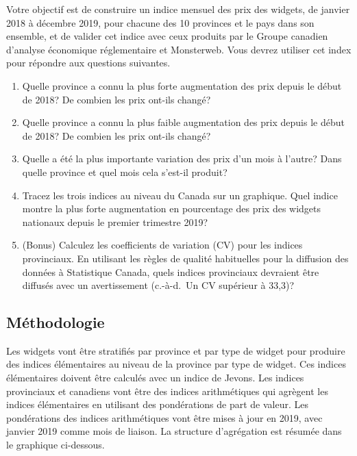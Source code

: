 \documentclass[]{article}
\begin{document}
Votre objectif est de construire un indice mensuel des prix des widgets, de janvier 2018 à décembre 2019, pour chacune des 10 provinces et le pays dans son ensemble, et de valider cet indice avec ceux produits par le Groupe canadien d'analyse économique réglementaire et Monsterweb. Vous devrez utiliser cet index pour répondre aux questions suivantes.

\begin{enumerate}
\def\labelenumi{\arabic{enumi}.}
\item
  Quelle province a connu la plus forte augmentation des prix depuis le début de 2018? De combien les prix ont-ils changé?
\item
  Quelle province a connu la plus faible augmentation des prix depuis le début de 2018? De combien les prix ont-ils changé?
\item
  Quelle a été la plus importante variation des prix d'un mois à l'autre? Dans quelle province et quel mois cela s'est-il produit?
\item
  Tracez les trois indices au niveau du Canada sur un graphique. Quel indice montre la plus forte augmentation en pourcentage des prix des widgets nationaux depuis le premier trimestre 2019?
\item
  (Bonus) Calculez les coefficients de variation (CV) pour les indices provinciaux. En utilisant les règles de qualité habituelles pour la diffusion des données à Statistique Canada, quels indices provinciaux devraient être diffusés avec un avertissement (c.-à-d.~Un CV supérieur à 33,3)?
\end{enumerate}

\hypertarget{muxe9thodologie}{%
\subsection{Méthodologie}\label{muxe9thodologie}}

Les widgets vont être stratifiés par province et par type de widget pour produire des indices élémentaires au niveau de la province par type de widget. Ces indices élémentaires doivent être calculés avec un indice de Jevons. Les indices provinciaux et canadiens vont être des indices arithmétiques qui agrègent les indices élémentaires en utilisant des pondérations de part de valeur. Les pondérations des indices arithmétiques vont être mises à jour en 2019, avec janvier 2019 comme mois de liaison. La structure d'agrégation est résumée dans le graphique ci-dessous.
\end{document}
